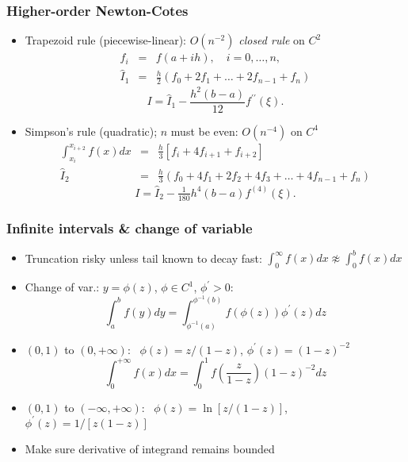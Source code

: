 \documentclass[bigger,handout]{beamer}
\newenvironment{stepitemize}{\begin{itemize}[<+->]}{\end{itemize} }
\begin{document}
\begin{frame}%
\frametitle{Higher-order Newton-Cotes}

\begin{stepitemize}
\item Trapezoid rule (piecewise-linear): $O(n^{-2})$ \emph{closed rule} on $C^2$
\begin{eqnarray*}
f_{i} &=&f(a+ih),\quad i=0,\ldots ,n, \\
\hat{I}_{1} &=&\frac{h}{2}\left( f_{0}+2f_{1}+\ldots +2f_{n-1}+f_{n}\right)
\end{eqnarray*}%
\begin{equation*}
I=\hat{I}_{1}-\frac{h^{2}(b-a)}{12}f^{\prime \prime }(\xi ).
\end{equation*}

\item Simpson's rule (quadratic); $n$ must be even: $O(n^{-4})$ on $C^4$ 
\begin{eqnarray*}
\int_{x_{i}}^{x_{i+2}}f(x)dx &=&\frac{h}{3}\left[ f_{i}+4f_{i+1}+f_{i+2}%
\right] \\
\hat{I}_{2} &=&\frac{h}{3}\left( f_{0}+4f_{1}+2f_{2}+4f_{3}+\ldots
+4f_{n-1}+f_{n}\right)
\end{eqnarray*}%
\begin{equation*}
I=\hat{I}_{2}-\tfrac{1}{180}h^{4}(b-a)f^{(4)}(\xi ).
\end{equation*}
\end{stepitemize}


\end{frame}%

\begin{frame}%
\frametitle{Infinite intervals \& change of variable}

\begin{stepitemize}
\item Truncation risky unless tail known to decay fast: $\int_{0}^{\infty }f(x)dx\not\approx
\int_{0}^{b}f(x)dx$

\item Change of var.: $y=\phi \left( z\right) $, $\phi \in C^{1}$, $\phi
^{\prime }>0$:%
\begin{equation*}
\int_{a}^{b}f(y)dy=\int_{\phi ^{-1}(a)}^{\phi ^{-1}(b)}f(\phi (z))\phi
^{\prime }(z)dz
\end{equation*}

\item $\left( 0,1\right) $ to $\left( 0,+\infty \right) $: \ $\phi
(z)=z/(1-z)$, $\phi ^{\prime }(z)=(1-z)^{-2}$%
\begin{equation*}
\int_{0}^{+\infty }f(x)dx=\int_{0}^{1}f\left( \frac{z}{1-z}\right)
(1-z)^{-2}dz
\end{equation*}

\item $\left( 0,1\right) $ to $\left( -\infty ,+\infty \right) $: \ $\phi
(z)=\ln [z/(1-z)]$, $\phi ^{\prime }(z)=1/\left[ z\left( 1-z\right) \right] $

\item Make sure derivative of integrand remains bounded
\end{stepitemize}


\end{frame}%
\end{document}
